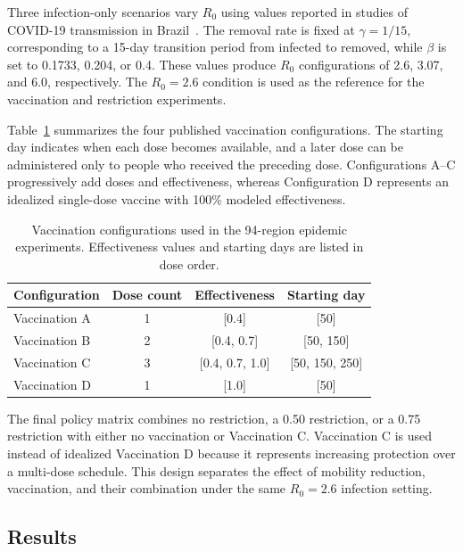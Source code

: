 Three infection-only scenarios vary $R_0$ using values reported in studies of COVID-19 transmission in Brazil~\citep{dutra2020covidR0,deSouza2020covirR0,dutra2021covidR0}. The removal rate is fixed at $\gamma=1/15$, corresponding to a 15-day transition period from infected to removed, while $\beta$ is set to 0.1733, 0.204, or 0.4. These values produce $R_0$ configurations of 2.6, 3.07, and 6.0, respectively. The $R_0=2.6$ condition is used as the reference for the vaccination and restriction experiments.

Table~\ref{tbl:vaccine_configuration_94} summarizes the four published vaccination configurations. The starting day indicates when each dose becomes available, and a later dose can be administered only to people who received the preceding dose. Configurations A--C progressively add doses and effectiveness, whereas Configuration D represents an idealized single-dose vaccine with 100\% modeled effectiveness.

\begin{table}[ht]
\centering
\footnotesize
\caption{Vaccination configurations used in the 94-region epidemic experiments. Effectiveness values and starting days are listed in dose order.}
\label{tbl:vaccine_configuration_94}
\begin{tabular}{@{}lccc@{}}
\toprule
\textbf{Configuration} & \textbf{Dose count} & \textbf{Effectiveness} & \textbf{Starting day} \\
\midrule
Vaccination A & 1 & [0.4] & [50] \\
Vaccination B & 2 & [0.4, 0.7] & [50, 150] \\
Vaccination C & 3 & [0.4, 0.7, 1.0] & [50, 150, 250] \\
Vaccination D & 1 & [1.0] & [50] \\
\bottomrule
\end{tabular}
\end{table}

The final policy matrix combines no restriction, a 0.50 restriction, or a 0.75 restriction with either no vaccination or Vaccination C. Vaccination C is used instead of idealized Vaccination D because it represents increasing protection over a multi-dose schedule. This design separates the effect of mobility reduction, vaccination, and their combination under the same $R_0=2.6$ infection setting.

\subsection{Results}
\label{sec:large_scale_epidemic_results}

